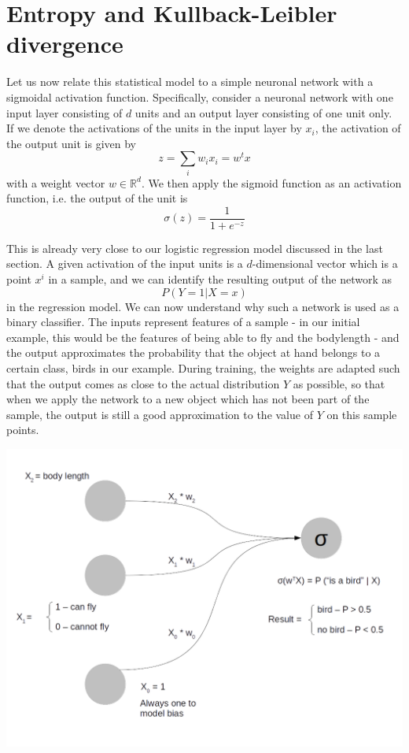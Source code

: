 \documentclass[a4paper, draft]{report}
\numberwithin{section}{chapter}
\numberwithin{equation}{chapter}
\theoremstyle{own}
\theoremstyle{remark}
\newcommand{\R}{\mathbb{R}}
\begin{document}
\chapter{Entropy and Kullback-Leibler divergence}\label{sec:entropy-and-kullback-leibler-diverergence}

Let us now relate this statistical model to a simple neuronal network with a sigmoidal activation function. Specifically, consider a neuronal network with one input layer consisting of $d$ units and an output layer consisting of one unit only. If we denote the activations of the units in the input layer by $x_i$, the activation of the output unit is given by 
$$
z = \sum_i w_i x_i = w^t x
$$
with a weight vector $w \in \R^d$. We then apply the sigmoid function as an activation function, i.e. the output of the unit is
$$
\sigma(z) = \frac{1}{1+e^{-z}}
$$

This is already very close to our logistic regression model discussed in the last section. A given activation of the input units is a $d$-dimensional vector which is a point $x^i$ in a sample, and we can identify the resulting output of the network as 
$$
P(Y = 1 | X = x)
$$ 
in the regression model. We can now understand why such a network is used as a binary classifier. The inputs represent features of a sample - in our initial example, this would be the features of being able to fly and the bodylength - and the output approximates the probability that the object at hand belongs to a certain class, birds in our example. During training, the weights are adapted such that the output comes as close to the actual distribution $Y$ as possible, so that when we apply the network to a new object which has not been part of the sample, the output is still a good approximation to the value of $Y$ on this sample points. 

\includegraphics[scale=.4]{BirdClassifier.png}
\end{document}
